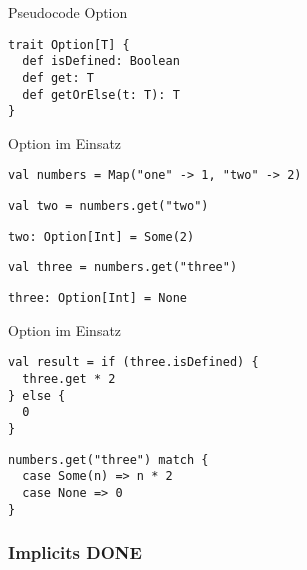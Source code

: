 \documentclass[14pt,aspectratio=169,trans]{beamer} %
\begin{document}
\begin{frame}[fragile]{}
	\begin{block}{Pseudocode Option}
		\scriptsize
		\onslide<2->
  \begin{lstlisting}
trait Option[T] {
  def isDefined: Boolean
  def get: T
  def getOrElse(t: T): T
}
	\end{lstlisting}
	\end{block}
	\note{}
\end{frame}

\begin{frame}[fragile]{}
	\begin{block}{Option im Einsatz}
		\scriptsize
		\onslide<2->
  \begin{lstlisting}
val numbers = Map("one" -> 1, "two" -> 2)
	\end{lstlisting}
  \begin{lstlisting}[firstnumber=2]
val two = numbers.get("two")
	\end{lstlisting}
  \begin{lstlisting}[firstnumber=3]
two: Option[Int] = Some(2)
	\end{lstlisting}
  \begin{lstlisting}[firstnumber=4]
val three = numbers.get("three")
	\end{lstlisting}
  \begin{lstlisting}[firstnumber=5]
three: Option[Int] = None
	\end{lstlisting}
	\end{block}
	\note{}
\end{frame}

\begin{frame}[fragile]{}
	\begin{block}{Option im Einsatz}
		\scriptsize
	\onslide<1->
  \begin{lstlisting}[firstnumber=6]
val result = if (three.isDefined) {
  three.get * 2
} else {
  0
}
	\end{lstlisting}
  \begin{lstlisting}[firstnumber=11]
numbers.get("three") match {
  case Some(n) => n * 2
  case None => 0
}
	\end{lstlisting}	
	\end{block}
	\note{}
\end{frame}


\subsubsection*{Implicits DONE}
\end{document}
